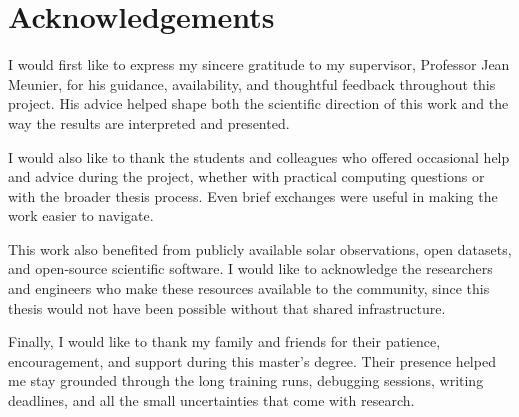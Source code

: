 \documentclass[12pt,twoside,maitrise]{dms}
\newenvironment{notocentry}{%
  \let\savedaddcontentsline\addcontentsline
  \renewcommand{\addcontentsline}[3]{}%
}{%
  \let\addcontentsline\savedaddcontentsline
}
\numberwithin{equation}{section}
\numberwithin{table}{chapter}
\numberwithin{figure}{chapter}
\begin{document}

\begin{notocentry}
\chapter*{Acknowledgements}

I would first like to express my sincere gratitude to my supervisor, Professor Jean Meunier, for his guidance, availability, and thoughtful feedback throughout this project. His advice helped shape both the scientific direction of this work and the way the results are interpreted and presented.

I would also like to thank the students and colleagues who offered occasional help and advice during the project, whether with practical computing questions or with the broader thesis process. Even brief exchanges were useful in making the work easier to navigate.

This work also benefited from publicly available solar observations, open datasets, and open-source scientific software. I would like to acknowledge the researchers and engineers who make these resources available to the community, since this thesis would not have been possible without that shared infrastructure.

Finally, I would like to thank my family and friends for their patience, encouragement, and support during this master's degree. Their presence helped me stay grounded through the long training runs, debugging sessions, writing deadlines, and all the small uncertainties that come with research.

\end{notocentry}


\NoChapterPageNumber
\cleardoublepage
{}




\end{document}
